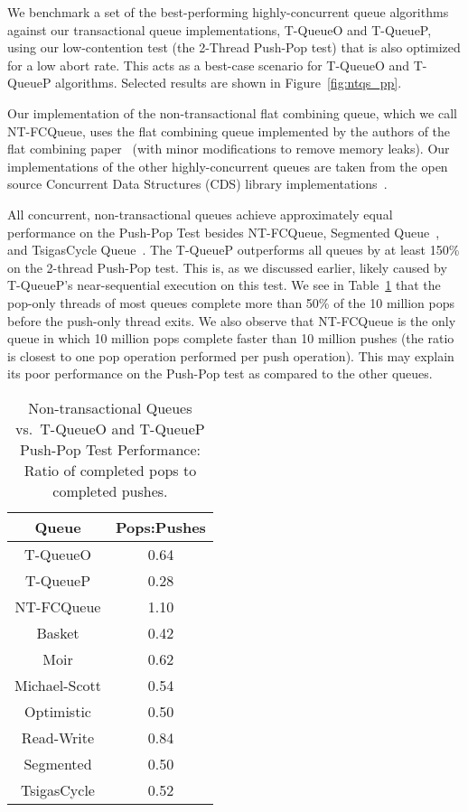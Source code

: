 We benchmark a set of the best-performing highly-concurrent queue algorithms against our transactional queue implementations, T-QueueO and T-QueueP, using our low-contention test (the 2-Thread Push-Pop test) that is also optimized for a low abort rate. This acts as a best-case scenario for T-QueueO and T-QueueP algorithms. Selected results are shown in Figure~\ref{fig:ntqs_pp}.

Our implementation of the non-transactional flat combining queue, which we call NT-FCQueue, uses the flat combining queue implemented by the authors of the flat combining paper~\cite{flatcombining} (with minor modifications to remove memory leaks). Our implementations of the other highly-concurrent queues are taken from the open source Concurrent Data Structures (CDS) library implementations~\cite{libcds}. 

All concurrent, non-transactional queues achieve approximately equal performance on the Push-Pop Test besides NT-FCQueue, Segmented Queue~\cite{queue4}, and TsigasCycle Queue~\cite{queue5}. 
The T-QueueP outperforms all queues by at least 150\% on the 2-thread Push-Pop test. This is, as we discussed earlier, likely caused by T-QueueP's near-sequential execution on this test. We see in Table~\ref{tab:push_pop_ratio} that the pop-only threads of most queues complete more than 50\% of the 10 million pops before the push-only thread exits.
We also observe that NT-FCQueue is the only queue in which 10 million pops complete faster than 10 million pushes (the ratio is closest to one pop operation performed per push operation). This may explain its poor performance on the Push-Pop test as compared to the other queues.

\begin{table}[t]
        \centering
    \begin{tabular}{|cc|}
        \hline
        Queue & Pops:Pushes\\
        \hline
            T-QueueO & 0.64\\
            T-QueueP & 0.28\\
            NT-FCQueue & 1.10\\
            Basket & 0.42\\
            Moir & 0.62\\
            Michael-Scott& 0.54\\
            Optimistic & 0.50\\
            Read-Write & 0.84\\
            Segmented & 0.50\\
            TsigasCycle & 0.52\\
        \hline
    \end{tabular}
    \caption{Non-transactional Queues vs.\ T-QueueO and T-QueueP Push-Pop Test Performance: Ratio of completed pops to completed pushes.}
    \label{tab:push_pop_ratio}
\end{table}

